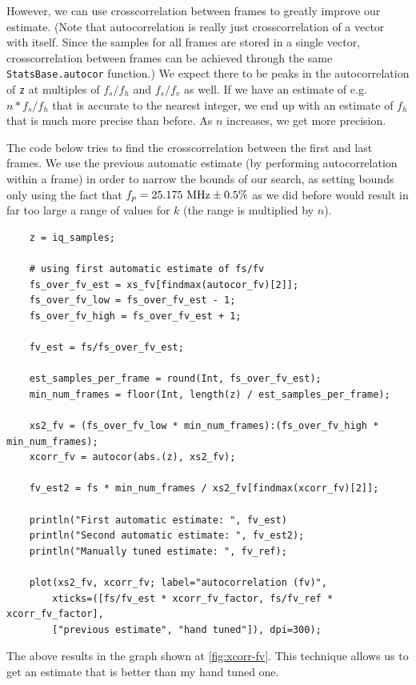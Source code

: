 \documentclass{article}
\newcommand*{\code}[1]{\texttt{#1}}
\begin{document}
However, we can use crosscorrelation between frames to greatly improve our estimate. (Note that autocorrelation is really just crosscorrelation of a vector with itself. Since the samples for all frames are stored in a single vector, crosscorrelation between frames can be achieved through the same \code{StatsBase.autocor} function.) We expect there to be peaks in the autocorrelation of \code{z} at multiples of $f_s / f_h$ and $f_s / f_v$ as well. If we have an estimate of e.g. $n * f_s / f_h$ that is accurate to the nearest integer, we end up with an estimate of $f_h$ that is much more precise than before. As $n$ increases, we get more precision.

The code below tries to find the crosscorrelation between the first and last frames. We use the previous automatic estimate (by performing autocorrelation within a frame) in order to narrow the bounds of our search, as setting bounds only using the fact that $f_p = \textnormal{25.175 MHz} \pm \textnormal{0.5\%}$ as we did before would result in far too large a range of values for $k$ (the range is multiplied by $n$).

\begin{verbatim}
    z = iq_samples;

    # using first automatic estimate of fs/fv
    fs_over_fv_est = xs_fv[findmax(autocor_fv)[2]];
    fs_over_fv_low = fs_over_fv_est - 1;
    fs_over_fv_high = fs_over_fv_est + 1;

    fv_est = fs/fs_over_fv_est;

    est_samples_per_frame = round(Int, fs_over_fv_est);
    min_num_frames = floor(Int, length(z) / est_samples_per_frame);

    xs2_fv = (fs_over_fv_low * min_num_frames):(fs_over_fv_high * min_num_frames);
    xcorr_fv = autocor(abs.(z), xs2_fv);

    fv_est2 = fs * min_num_frames / xs2_fv[findmax(xcorr_fv)[2]];

    println("First automatic estimate: ", fv_est)
    println("Second automatic estimate: ", fv_est2);
    println("Manually tuned estimate: ", fv_ref);

    plot(xs2_fv, xcorr_fv; label="autocorrelation (fv)",
        xticks=([fs/fv_est * xcorr_fv_factor, fs/fv_ref * xcorr_fv_factor],
        ["previous estimate", "hand tuned"]), dpi=300);
\end{verbatim}

The above results in the graph shown at \ref{fig:xcorr-fv}. This technique allows us to get an estimate that is better than my hand tuned one.
\end{document}
